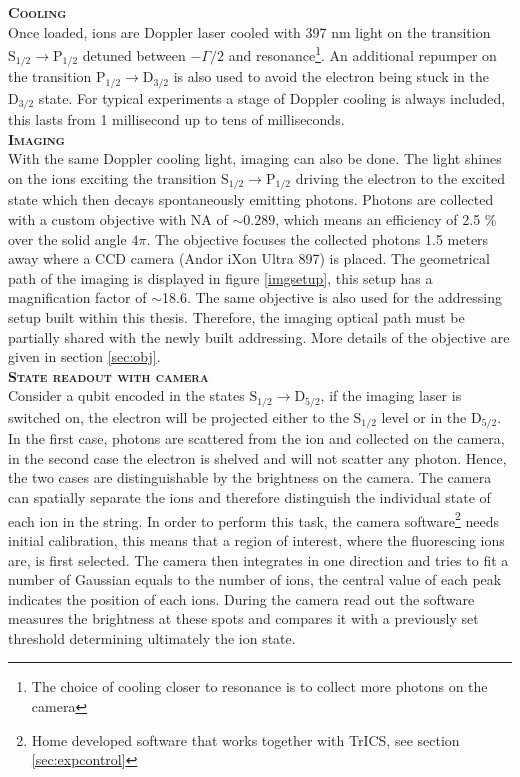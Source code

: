 \textbf{\textsc{Cooling}}\\
Once loaded, ions are Doppler laser cooled with 397 nm light on the transition $\text{S}_{1/2} \to \text{P}_{1/2}$ detuned between $-\Gamma/2$ and resonance\footnote{The choice of cooling closer to resonance is to collect more photons on the camera}. An additional repumper on the transition $\text{P}_{1/2} \to \text{D}_{3/2}$ is also used to avoid the electron being stuck in the $\text{D}_{3/2}$ state. For typical experiments a stage of Doppler cooling is always included, this lasts from 1 millisecond up to tens of milliseconds.\vspace{.5em}\\
\textbf{\textsc{Imaging}}\\
With the same Doppler cooling light, imaging can also be done. The light shines on the ions exciting the transition $\text{S}_{1/2} \to \text{P}_{1/2}$ driving the electron to the excited state which then decays spontaneously emitting photons. Photons are collected with a custom objective with NA of $\sim 0.289$, which means an efficiency of 2.5 \% over the solid angle $4\pi$. The objective focuses the collected photons 1.5 meters away where a CCD camera (Andor iXon Ultra 897) is placed. The geometrical path of the imaging is displayed in figure \ref{imgsetup}, this setup has a magnification factor of $\sim$18.6. The same objective is also used for the addressing setup built within this thesis. Therefore, the imaging optical path must be partially shared with the newly built addressing. More details of the objective are given in section \ref{sec:obj}.\vspace{.5em}\\
\textbf{\textsc{State readout with camera}}\\
Consider a qubit encoded in the states $\text{S}_{1/2} \to \text{D}_{5/2}$, if the imaging laser is switched on, the electron will be projected either to the $\text{S}_{1/2}$ level or in the $\text{D}_{5/2} $. In the first case, photons are scattered from the ion and collected on the camera, in the second case the electron is shelved and will not scatter any photon. Hence, the two cases are distinguishable by the brightness on the camera. The camera can spatially separate the ions and therefore distinguish the individual state of each ion in the string. In order to perform this task, the camera software\footnote{Home developed software that works together with TrICS, see section \ref{sec:expcontrol}} needs initial calibration, this means that a region of interest, where the fluorescing ions are, is first selected. The camera then integrates in one direction and tries to fit a number of Gaussian equals to the number of ions, the central value of each peak indicates the position of each ions. During the camera read out the software measures the brightness at these spots and compares it with a previously set threshold determining ultimately the ion state.

